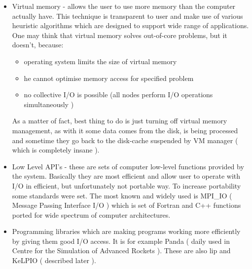 \begin{itemize}
	\item{Virtual memory} - allows the user to use more memory than the computer actually have.
	This technique is transparent to user and make use of various heuristic algorithms which are designed to support wide range of applications.
	One may think that virtual memory solves out-of-core problems, but it doesn't, because:
	\begin{itemize}
		\item{operating system limits the size of virtual memory}
		\item{he cannot optimise memory access for specified problem}
		\item{no collective I/O is possible (all nodes perform I/O operations simultaneously ) }
	\end{itemize}
	As a matter of fact, best thing to do is just turning off virtual memory management, as with it some data comes from the disk, is being processed and sometime they go back to the disk-cache suspended by VM manager ( which is completely insane ).
	\item{Low Level API's} - these are sets of computer low-level functions provided by the system. 
	Basically they are most efficient and allow user to operate with I/O in efficient, but unfortunately not portable way. 
	To increase portability some standards were set. 
	The most known and widely used is MPI\_IO ( Message Passing Interface I/O ) which is set of Fortran and C++ functions ported for wide spectrum of computer architectures\cite{mpi}.
	\item{Programming libraries} which are making programs working more efficiently by giving them good I/O access. It is for example Panda ( daily used in Centre for the Simulation of Advanced Rockets )\cite{panda}. These are also lip and KeLPIO ( described later ).
\end{itemize}
